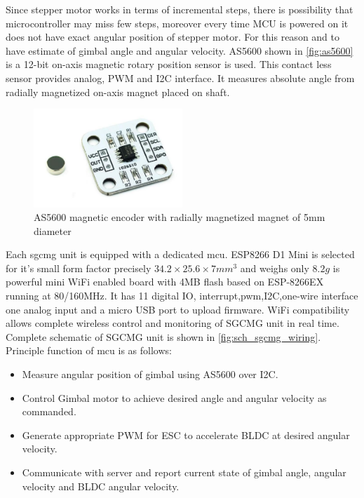 \noindent Since stepper motor works in terms of incremental steps, there is possibility that microcontroller may miss few steps, moreover every time MCU is powered on it does not have exact angular position of stepper motor. For this reason and to have estimate of gimbal angle and angular velocity. AS5600 shown in \autoref{fig:as5600} is a 12-bit on-axis magnetic rotary position sensor is used. This contact less sensor provides analog, PWM and I2C interface. It measures absolute angle from radially magnetized on-axis magnet placed on shaft. 
\begin{figure}[ht]
    \centering
    \includegraphics[width=0.5\textwidth]{figures/Assembly/AS5600.pdf}
    \caption{AS5600 magnetic encoder with radially magnetized magnet of 5mm diameter}
    \label{fig:as5600}
\end{figure}

\noindent Each \acrshort{sgcmg} unit is equipped with a dedicated \acrshort{mcu}. ESP8266 D1 Mini is selected for it's small form factor precisely $34.2\times25.6\times7 mm^3$ and weighs only $8.2g$ is powerful mini WiFi enabled board  with 4MB flash based on ESP-8266EX running at 80/160MHz. It has 11 digital IO, interrupt,pwm,I2C,one-wire interface one analog input and a micro USB port to upload firmware. WiFi compatibility allows complete wireless control and monitoring of SGCMG unit in real time. Complete schematic of SGCMG unit is shown in \autoref{fig:sch_sgcmg_wiring}. Principle function of \acrshort{mcu} is as follows:
\begin{itemize}
    \item Measure angular position of gimbal using AS5600 over I2C.
    \item Control Gimbal motor to achieve desired angle and angular velocity as commanded.
    \item Generate appropriate PWM for ESC to accelerate BLDC at desired angular velocity.
    \item Communicate with server and report current state of gimbal angle, angular velocity and BLDC angular velocity.
\end{itemize}

